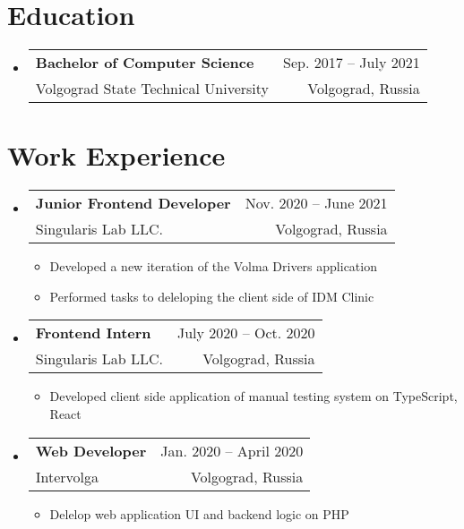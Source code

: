 \documentclass[A4,11pt]{article}
\makeatletter
\newcommand{\CVItem}[1]{
  \item\small{
    {#1 \vspace{-2pt}}
  }
}
\newcommand{\CVSubheading}[4]{
  \vspace{-2pt}\item
    \begin{tabular*}{0.97\textwidth}[t]{l@{\extracolsep{\fill}}r}
      \textbf{#1} & #2 \\
      \small#3 & \small #4 \\
    \end{tabular*}\vspace{-7pt}
}
\newcommand{\CVSubHeadingListStart}{\begin{itemize}[leftmargin=0.5cm, label={}]}
\newcommand{\CVSubHeadingListEnd}{\end{itemize}}
\newcommand{\CVItemListStart}{\begin{itemize}}
\newcommand{\CVItemListEnd}{\end{itemize}\vspace{-5pt}}
\makeatother
\begin{document}
\section{Education}
  \CVSubHeadingListStart

    \CVSubheading
      {{Bachelor of Computer Science }}{Sep. 2017 -- July 2021}
      {Volgograd State Technical University}{Volgograd, Russia}


  \CVSubHeadingListEnd

\begin{comment}
try to briefly explain what you did and why it is relevant to the position you
are seeking
\end{comment}

\section{Work Experience}
  \CVSubHeadingListStart


    \CVSubheading
      {Junior Frontend Developer}{Nov. 2020 -- June 2021}
      {Singularis Lab LLC.}{Volgograd, Russia}
    \CVItemListStart
      \CVItem{Developed a new iteration of the Volma Drivers application}
      \CVItem{Performed tasks to deleloping the client side of IDM Clinic}
    \CVItemListEnd

    \CVSubheading
      {Frontend Intern}{July 2020 -- Oct. 2020}
      {Singularis Lab LLC.}{Volgograd, Russia}
    \CVItemListStart
      \CVItem{Developed client side application of manual testing system on TypeScript, React}
    \CVItemListEnd

    \CVSubheading
      {Web Developer}{Jan. 2020 -- April 2020}
      {Intervolga}{Volgograd, Russia}
      \CVItemListStart
        \CVItem{Delelop web application UI and backend logic on PHP}
      \CVItemListEnd
  \CVSubHeadingListEnd
\end{document}
